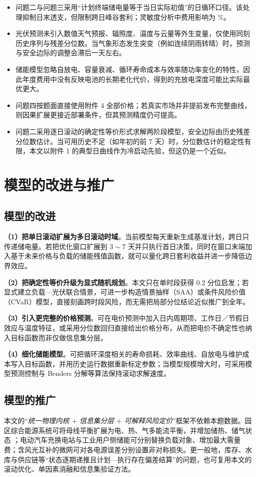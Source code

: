 \begin{itemize}[itemsep=2pt, topsep=3pt]
	\item 问题二与问题三采用“计划终端储电量等于当日实际初值”的日循环口径。该处理抑制日末透支，但限制跨日峰谷套利；灵敏度分析中费用影响为 \SensTerminalPct\%。
	\item 光伏预测未引入数值天气预报、辐照度、温度与云量等外生变量，仅使用同刻历史序列与残差分位数。当气象形态发生突变（例如连续阴雨转晴）时，预测与安全边际的调整会滞后一天左右。
	\item 储能模型忽略自放电、容量衰减、循环寿命成本与效率随功率变化的特性，因此年度费用中没有反映电池的长期老化代价，得到的充放电深度可能比实际最优更大。
	\item 问题四按题面直接使用附件 4 全部价格；若真实市场并非提前发布完整曲线，则因果扩展更接近部署条件，但其预测精度仍可提高。
	\item 问题二采用逐日滚动的确定性等价形式求解两阶段模型，安全边际由历史残差分位数估计。当可用历史不足（如年初的前 $7$ 天）时，分位数估计的稳定性有限，本文以附件 1 的典型日曲线作为冷启动先验，但这仍是一个近似。
\end{itemize}

\section{模型的改进与推广}

\subsection{模型的改进}
\label{sec:improve}

\textbf{（1）把单日滚动扩展为多日滚动时域}。当前模型每天重新生成基准计划，跨日只传递储电量。若把优化窗口扩展到 $3\sim7$ 天并只执行首日决策，同时在窗口末端加入基于未来价格与负载的储能残值函数，就可以量化跨日套利收益并进一步降低边界效应。

\textbf{（2）把确定性等价升级为显式随机规划}。本文只在单时段获得 $0.2$ 分位启发；若显式建立负载—光伏联合情景，可进一步构造情景抽样（SAA）或条件风险价值（CVaR）模型，直接刻画跨时段风险，而无需把局部分位结论近似推广到全年。

\textbf{（3）引入更完整的价格预测}。可在电价预测中加入日内周期项、工作日／节假日效应与温度特征，或采用分位数回归直接给出价格分布，从而把电价不确定性也纳入目标函数而非仅做信息集分层。

\textbf{（4）细化储能模型}。可把循环深度相关的寿命损耗、效率曲线、自放电与维护成本写入目标函数，并用历史运行数据重新标定参数；当模型规模增大时，可采用模型预测控制与 Benders 分解等算法保持滚动求解速度。

\subsection{模型的推广}

本文的“\emph{统一物理内核 $+$ 信息集分层 $+$ 可解释风险定价}”框架不依赖本题数据。园区综合能源系统可将母线平衡扩展为电、热、气多能流平衡，并增加储热、储气状态 \cite{liu2018dayahead}；电动汽车充换电站与工业用户侧储能可分别替换负载对象、增加最大需量费；含风光互补的微网可对各电源误差分别设置非对称损失。更一般地，库存、水库与供应链等“状态逐期递推且计划—执行存在偏差结算”的问题，也可复用本文的滚动优化、单因素消融和信息集验证方法。

